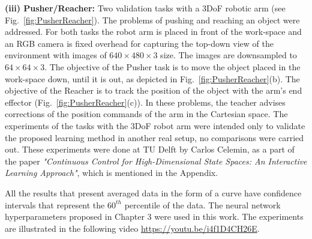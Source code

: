 \textbf{(iii) Pusher/Reacher:} Two validation tasks with a 3DoF robotic arm (see Fig.~\ref{fig:PusherReacher}). The problems of pushing  and reaching an object were addressed.  
For both tasks the robot arm is placed in front of the work-space and an RGB camera is fixed overhead for capturing the top-down view of the environment with images of $640\times480\times3$ size. The images are downsampled to $64\times64\times3$. The objective of the Pusher task is to move the object placed in the work-space down, until it is out, as depicted in Fig.~\ref{fig:PusherReacher}(b). The objective of the Reacher is to track the position of the object with the arm's end effector (Fig.~\ref{fig:PusherReacher}(c)). In these problems, the teacher advises corrections of the position commands of the arm in the Cartesian space. The experiments of the tasks with the 3DoF robot arm were intended only to validate the proposed learning method in another real setup, no comparisons were carried out. These experiments were done at TU Delft by Carlos Celemin, as a part of the paper \emph{"Continuous Control for High-Dimensional State Spaces: An Interactive Learning Approach"}, which is mentioned in the Appendix.

All the results that present averaged data in the form of a curve have confidence intervals that represent the $60^{th}$ percentile of the data.
The neural network hyperparameters proposed in Chapter 3 were used in this work. The experiments are illustrated in the following video \url{https://youtu.be/i4f1D4CH26E}. 

